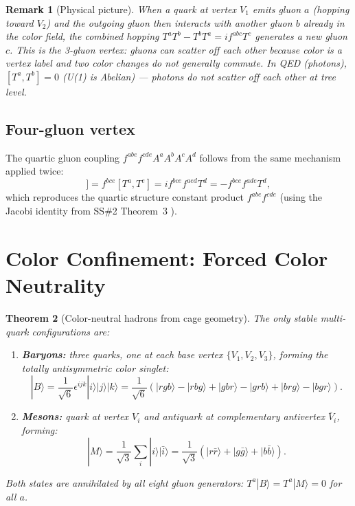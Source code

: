 \documentclass[11pt,a4paper]{article}
\newtheorem{theorem}{Theorem}[section]
\newtheorem{remark}[theorem]{Remark}
\newcommand{\ket}[1]{|#1\rangle}
\begin{document}
\begin{remark}[Physical picture]
When a quark at vertex $V_1$ emits gluon $a$ (hopping toward
$V_2$) and the outgoing gluon then interacts with another gluon
$b$ already in the color field, the combined hopping
$T^aT^b - T^bT^a = if^{abc}T^c$ generates a new gluon $c$.
This is the 3-gluon vertex: gluons can scatter off each other
because color is a vertex label and two color changes do not
generally commute.  In QED (photons), $[T^a, T^b] = 0$
(U(1) is Abelian) --- photons do not scatter off each other
at tree level.
\end{remark}

\subsection{Four-gluon vertex}

The quartic gluon coupling $f^{abe}f^{cde}A^aA^bA^cA^d$ follows
from the same mechanism applied twice:
\begin{equation}
[T^a, [T^b, T^c]]
= f^{bce}[T^a, T^e]
= if^{bce}f^{aed}T^d
= -f^{bce}f^{ade}T^d,
\label{eq:4gluon}
\end{equation}
which reproduces the quartic structure constant product
$f^{abe}f^{cde}$ (using the Jacobi identity from SS\#2
Theorem~3 \citep{cpp_ss2}).

\section{Color Confinement: Forced Color Neutrality}

\begin{theorem}[Color-neutral hadrons from cage geometry]
\label{thm:confinement}
The only stable multi-quark configurations are:
\begin{enumerate}
\item \textbf{Baryons:} three quarks, one at each base vertex
  $\{V_1, V_2, V_3\}$, forming the totally antisymmetric
  color singlet:
  \begin{equation}
  \ket{B} = \frac{1}{\sqrt{6}}\epsilon^{ijk}\ket{i}\ket{j}\ket{k}
  = \frac{1}{\sqrt{6}}(\ket{rgb} - \ket{rbg} + \ket{gbr} - \ket{grb}
    + \ket{brg} - \ket{bgr}).
  \label{eq:baryon_singlet}
  \end{equation}
\item \textbf{Mesons:} quark at vertex $V_i$ and antiquark at
  complementary antivertex $\bar{V}_i$, forming:
  \begin{equation}
  \ket{M} = \frac{1}{\sqrt{3}}\sum_i \ket{i}\ket{\bar{i}}
  = \frac{1}{\sqrt{3}}(\ket{r\bar{r}} + \ket{g\bar{g}}
    + \ket{b\bar{b}}).
  \label{eq:meson_singlet}
  \end{equation}
\end{enumerate}
Both states are annihilated by all eight gluon generators:
$T^a\ket{B} = T^a\ket{M} = 0$ for all $a$.
\end{theorem}
\end{document}
